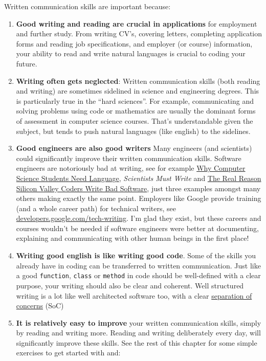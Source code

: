 \documentclass[
]{book}
\providecommand{\tightlist}{%
  \setlength{\itemsep}{0pt}\setlength{\parskip}{0pt}}
\begin{document}
Written communication skills are important because:

\begin{enumerate}
\def\labelenumi{\arabic{enumi}.}
\tightlist
\item
  \textbf{Good writing and reading are crucial in applications} for employment and further study. From writing CV's, covering letters, completing application forms and reading job specifications, and employer (or course) information, your ability to read and write natural languages is crucial to coding your future.
\item
  \textbf{Writing often gets neglected}: Written communication skills (both reading and writing) are sometimes sidelined in science and engineering degrees. This is particularly true in the ``hard sciences''. For example, communicating and solving problems using code or mathematics are usually the dominant forms of assessment in computer science courses. That's understandable given the subject, but tends to push natural languages (like english) to the sidelines.
\item
  \textbf{Good engineers are also good writers} Many engineers (and scientists) could significantly improve their written communication skills. Software engineers are notoriously bad at writing, see for example \href{https://dl.acm.org/doi/10.1145/960492.960525}{Why Computer Science Students Need Language}, \citep{Beaubouef2003} \emph{Scientists Must Write} \citep{scientistsmustwrite} and \href{https://www.theatlantic.com/national/archive/2012/10/the-real-reason-silicon-valley-coders-write-bad-software/263377/}{The Real Reason Silicon Valley Coders Write Bad Software}, \citep{writebadsoftware} just three examples amongst many others making exactly the same point. Employers like Google provide training (and a whole career path) for technical writers, see \href{https://developers.google.com/tech-writing}{developers.google.com/tech-writing}. I'm glad they exist, but these careers and courses wouldn't be needed if software engineers were better at documenting, explaining and communicating with other human beings in the first place!
\item
  \textbf{Writing good english is like writing good code}. Some of the skills you already have in coding can be transferred to written communication. Just like a good \texttt{function}, \texttt{class} or \texttt{method} in code should be well-defined with a clear purpose, your writing should also be clear and coherent. Well structured writing is a lot like well architected software too, with a clear \href{https://en.wikipedia.org/wiki/Separation_of_concerns}{separation of concerns} (SoC)
\item
  \textbf{It is relatively easy to improve} your written communication skills, simply by reading and writing more. Reading and writing deliberately every day, will significantly improve these skills. See the rest of this chapter for some simple exercises to get started with and:


\end{enumerate}
\end{document}
